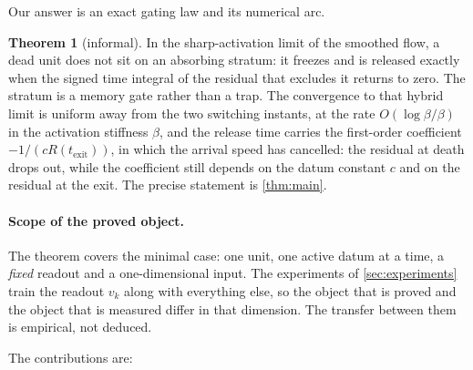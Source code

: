 \documentclass[11pt]{article}
\theoremstyle{definition}
\newtheorem*{theorem*}{Theorem}
\theoremstyle{remark}
\newcommand{\texit}{t_{\mathrm{exit}}}
\begin{document}
Our answer is an exact gating law and its numerical arc.

\begin{theorem*}[informal]
In the sharp-activation limit of the smoothed flow, a dead unit does not sit on
an absorbing stratum: it freezes and is released exactly when the signed time
integral of the residual that excludes it returns to zero. The stratum is a
memory gate rather than a trap. The convergence to that hybrid limit is uniform
away from the two switching instants, at the rate $O(\log\beta/\beta)$ in the
activation stiffness $\beta$, and the release time carries the first-order
coefficient $-1/(cR(\texit))$, in which the arrival speed has cancelled: the
residual at death drops out, while the coefficient still depends on the datum
constant $c$ and on the residual at the exit. The precise statement is
\cref{thm:main}.
\end{theorem*}

\paragraph{Scope of the proved object.} The theorem covers the minimal case:
one unit, one active datum at a time, a \emph{fixed} readout and a
one-dimensional input. The experiments of \cref{sec:experiments} train the
readout $v_k$ along with everything else, so the object that is proved and the
object that is measured differ in that dimension. The transfer between them is
empirical, not deduced.

The contributions are:
\end{document}
